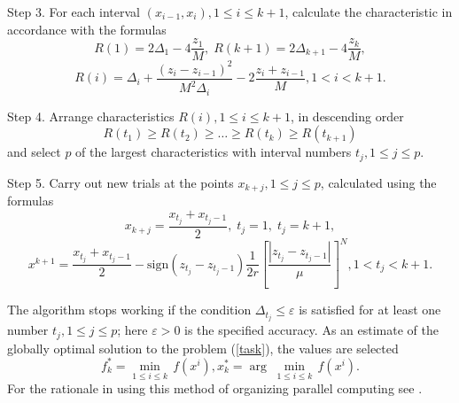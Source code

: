 \documentclass{svproc}
\begin{document}
Step 3. For each interval \((x_{i-1},x_i),1\leqslant i\leqslant k+1\), calculate the characteristic in accordance with the formulas 
\begin{displaymath}
\label{step3_1}
R(1)=2\Delta_1-4\dfrac{z_1}{M}, \; R(k+1)=2\Delta_{k+1}-4\dfrac{z_k}{M},
\end{displaymath}
\begin{displaymath}
\label{step3_2}
R(i)=\Delta_i+\dfrac{(z_i-z_{i-1})^2}{M^2\Delta_i}-2\dfrac{z_i+z_{i-1}}{M},1<i<k+1.
\end{displaymath}

Step 4. Arrange characteristics \(R(i),1\leqslant i\leqslant k+1\), in descending order 
\begin{displaymath}
\label{step4}
R(t_1)\geqslant R(t_2)\geqslant \dots \geqslant R(t_{k})\geqslant R(t_{k+1})
\end{displaymath}
and select \(p\) of the largest characteristics with interval numbers \(t_j,1\leqslant j\leqslant p\).

Step 5. Carry out new trials at the points \(x_{k+j},1\leqslant j\leqslant p\), calculated using the formulas
\begin{displaymath}
x_{k+j}=\dfrac{x_{t_j}+x_{t_j-1}}{2},\; t_j=1, \; t_j=k+1,
\end{displaymath}
\begin{displaymath}
\label{step5}
{{x}^{k+1}}=\frac{{{x}_{{{t}_{j}}}}+{{x}_{{{t}_{j}}-1}}}{2}-\text{sign}({{z}_{{{t}_{j}}}}-{{z}_{{{t}_{j}}-1}})\frac{1}{2r}{{\left[ \frac{|{{z}_{{{t}_{j}}}}-{{z}_{{{t}_{j}}-1}}|}{\mu } \right]}^{N}}, 1<{{t}_{j}}<k+1.
\end{displaymath}

The algorithm stops working if the condition \(\Delta_{t_j}\leqslant \varepsilon\)  is satisfied for at least one number \(t_j,1\leqslant j\leqslant p\); here \(\varepsilon>0\)  is the specified accuracy. As an estimate of the globally optimal solution to the problem (\ref{task}), the values are selected 
\begin{displaymath}
f_{k}^{*}=\underset{1\le i\le k}{\mathop{\min }}\,f({{x}^{i}}),   x_{k}^{*}=\arg \; \underset{1\le i\le k}{\mathop{\min }}\,f({{x}^{i}}).
\end{displaymath}
For the rationale in using this method of organizing parallel computing see \cite{Strongin2000}. 
\end{document}
